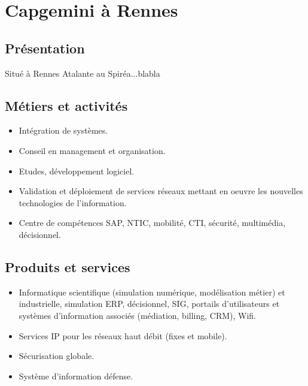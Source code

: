 \chapter{Capgemini à Rennes}
\section{Présentation}
Situé à Rennes Atalante au Spiréa...blabla
\section{Métiers et activités}
\begin{itemize}
\item Intégration de systèmes.
\item Conseil en management et organisation.
\item Etudes, développement logiciel.
\item Validation et déploiement de services réseaux mettant en oeuvre les nouvelles technologies de l'information.
\item Centre de compétences SAP, NTIC, mobilité, CTI, sécurité, multimédia, décisionnel.
\end{itemize}
\section{Produits et services}
\begin{itemize}
\item Informatique scientifique (simulation numérique, modélisation métier) et industrielle, simulation ERP, décisionnel, SIG, portails d'utilisateurs et systèmes d'information associés (médiation, billing, CRM), Wifi.
\item Services IP pour les réseaux haut débit (fixes et mobile).
\item Sécurisation globale.
\item Système d'information défense.
\end{itemize}
